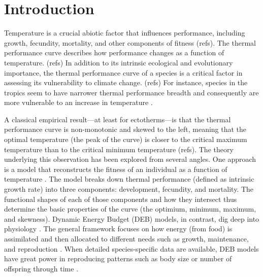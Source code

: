 \section*{Introduction}

Temperature is a crucial abiotic factor that influences performance, including growth, fecundity, mortality, and other components of fitness (refs). %
The thermal performance curve describes how performance changes as a function of temperature. (refs) %
In addition to its intrinsic ecological and evolutionary importance, the thermal performance curve of a species is a critical factor in assessing its vulnerability to climate change. (refs) %
For instance, species in the tropics seem to have narrower thermal performance breadth and consequently are more vulnerable to an increase in temperature \citep{Deutsch2008}.

A classical empirical result---at least for ectotherms---is that the thermal performance curve is non-monotonic and skewed to the left, meaning that the optimal temperature (the peak of the curve) is closer to the critical maximum temperature than to the critical minimum temperature \citep[e.g.,][]{Angilletta2009} (refs). %
The theory underlying this observation has been explored from several angles.  %
One approach is a model that reconstructs the fitness of an individual as a function of temperature \citep{Amarasekare2012}.
The model breaks down thermal performance (defined as intrinsic growth rate) into three components: development, fecundity, and mortality. %
The functional shapes of each of those components and how they intersect thus determine the basic properties of the curve (the optimium, minimum, maximum, and skewness).
Dynamic Energy Budget (DEB) models, in contrast, dig deep into physiology \citep{Kooijman2009}.
The general framework focuses on how energy (from food) is assimilated and then allocated to different needs such as growth, maintenance, and reproduction \citep{Kooijman2009}. %
When detailed species-specific data are available, DEB models have great power in reproducing patterns such as body size or number of offspring through time \citep{Nisbet2000}. %

